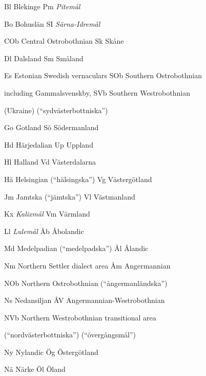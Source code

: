 Bl  Blekinge  Pm  \textit{Pitemål}

Bo  Bohuslän  SI  \textit{Särna-Idremål}

COb  Central Ostrobothnian  Sk  Skåne

Dl  Dalsland  Sm  Småland

Es  Estonian Swedish vernaculars   SOb  Southern Ostrobothnian

  including Gammalsvenskby,  SVb  Southern Westrobothnian

  (Ukraine)    (“sydvästerbottniska”)

Go  Gotland  Sö  Södermanland

Hd  Härjedalian  Up  Uppland

Hl  Halland  Vd  Västerdalarna

Hä  Helsingian (“hälsingska”)  Vg  Västergötland

Jm  Jamtska (“jämtska”)  Vl  Västmanland

Kx  \textit{Kalixmål}  Vm  Värmland

Ll  \textit{Lulemål}  Åb  Åbolandic

Md  Medelpadian (“medelpadska”)  Ål  Ålandic

Nm  Northern Settler dialect area  Åm  Angermannian

NOb  Northern Ostrobothnian    (“ångermanländska”)

Ns  Nedansiljan  ÅV  Angermannian-Westrobothnian

NVb  Northern Westrobothnian    transitional area

  (“nordvästerbottniska”)    (“övergångsmål”)

Ny  Nylandic  Ög  Östergötland

Nä  Närke  Öl  Öland

